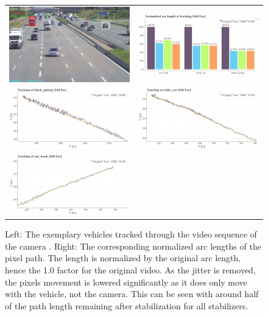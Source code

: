     




\begin{figure}[!ht]
  \centering
  \begin{tabular}{cc}
    \includegraphics[width=0.45\linewidth]{diagrams/object_tracking/s40_n_far/frame.png}    &  
    \includegraphics[width=0.475\linewidth]{diagrams/object_tracking/s40_n_far/arcs.png}    \\

    \includegraphics[width=0.475\linewidth]{diagrams/object_tracking/s40_n_far/black_pickup.png}    &  
    \includegraphics[width=0.475\linewidth]{diagrams/object_tracking/s40_n_far/white_car.png}    \\  
    \includegraphics[width=0.475\linewidth]{diagrams/object_tracking/s40_n_far/red_truck.png}   
  \end{tabular}
  \caption{Left: 
  The exemplary vehicles tracked through the video sequence of the camera . 
  Right:
  The corresponding normalized arc lengths of the pixel path. 
  The length is normalized by the original arc length, hence the 1.0 factor for the original video. 
  As the jitter is removed, the pixels movement is lowered significantly as it does only move with the vehicle, not the camera.
  This can be seen with around half of the path length remaining after stabilization for all stabilizers.
  }
  \label{fig:object_tracking_appendix_s40_n_far}
\end{figure}
